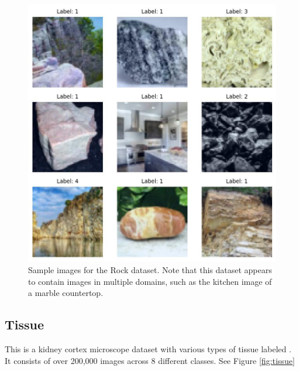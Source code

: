 \documentclass[letterpaper]{article} %
\theoremstyle{plain}
\theoremstyle{definition}
\theoremstyle{remark}
\begin{document}
\begin{figure}[htbp]
    \centering
    \includegraphics[width=\columnwidth]{../../images/rock_1_sample.jpg}
    \caption{Sample images for the Rock dataset. Note that this dataset appears to contain images in multiple domains, such as the kitchen image of a marble countertop.}
    \label{fig:rock}
\end{figure}



\subsection{Tissue} This is a kidney cortex microscope dataset with various types of tissue labeled \citep{yang2023medmnist}. It consists of over 200,000 images across 8 different classes. See Figure \ref{fig:tissue}
\end{document}
